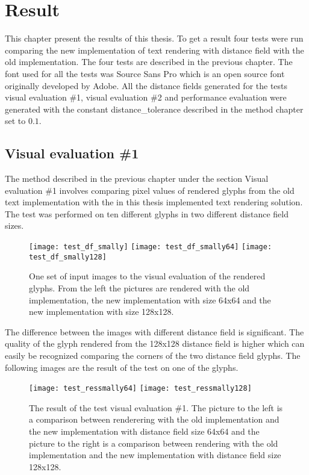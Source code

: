 \chapter{Result}\label{cha:Research}
This chapter present the results of this thesis. To get a result four tests were run comparing the new implementation of text rendering with distance field with the old implementation. The four tests are described in the previous chapter. The font used for all the tests was Source Sans Pro which is an open source font originally developed by Adobe. All the distance fields generated for the tests visual evaluation \#1, visual evaluation \#2 and performance evaluation were generated with the constant distance\_tolerance described in the method chapter set to $0.1$.
\section{Visual evaluation \#1}\label{sec:research:history}
The method described in the previous chapter under the section Visual evaluation \#1 involves comparing pixel values of rendered glyphs from the old text implementation with the in this thesis implemented text rendering solution. The test was performed on ten different glyphs in two different distance field sizes.

\begin{figure}[H]
  \texttt{[image: test\_df\_smally]}
\endminipage\hfill
{}
  \texttt{[image: test\_df\_smally64]}
\endminipage\hfill
{}
  \texttt{[image: test\_df\_smally128]}
\endminipage\hfill
\caption{One set of input images to the visual evaluation of the rendered glyphs. From the left the pictures are rendered with the old implementation, the new implementation with size 64x64 and the new implementation with size 128x128.}\label{fig:awesome_image2}
\end{figure}

The difference between the images with different distance field is significant. The quality of the glyph rendered from the 128x128 distance field is higher which can easily be recognized comparing the corners of the two distance field glyphs. The following images are the result of the test on one of the glyphs. 

\begin{figure}[H]
  \texttt{[image: test\_ressmally64]}
\endminipage\hfill
{}
  \texttt{[image: test\_ressmally128]}
\endminipage\hfill
\caption{The result of the test visual evaluation \#1. The picture to the left is a comparison between renderering with the old implementation and the new implementation with distance field size 64x64 and the picture to the right is a comparison between rendering with the old implementation and the new implementation with distance field size 128x128.}\label{fig:awesome_image2}
\end{figure}


